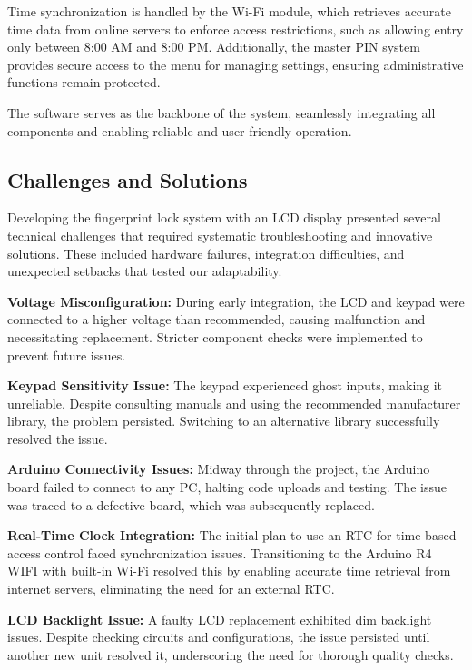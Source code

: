 \documentclass{article}
\begin{document}
Time synchronization is handled by the Wi-Fi module, which retrieves accurate time data from online servers to enforce access restrictions, such as allowing entry only between 8:00 AM and 8:00 PM. Additionally, the master PIN system provides secure access to the menu for managing settings, ensuring administrative functions remain protected.

The software serves as the backbone of the system, seamlessly integrating all components and enabling reliable and user-friendly operation.

\subsection{Challenges and Solutions}

Developing the fingerprint lock system with an LCD display presented several technical challenges that required systematic troubleshooting and innovative solutions. These included hardware failures, integration difficulties, and unexpected setbacks that tested our adaptability.

\textbf{Voltage Misconfiguration:} During early integration, the LCD and keypad were connected to a higher voltage than recommended, causing malfunction and necessitating replacement. Stricter component checks were implemented to prevent future issues.

\textbf{Keypad Sensitivity Issue:} The keypad experienced ghost inputs, making it unreliable. Despite consulting manuals and using the recommended manufacturer library, the problem persisted. Switching to an alternative library successfully resolved the issue.

\textbf{Arduino Connectivity Issues:} Midway through the project, the Arduino board failed to connect to any PC, halting code uploads and testing. The issue was traced to a defective board, which was subsequently replaced.

\textbf{Real-Time Clock Integration:} The initial plan to use an RTC for time-based access control faced synchronization issues. Transitioning to the Arduino R4 WIFI with built-in Wi-Fi resolved this by enabling accurate time retrieval from internet servers, eliminating the need for an external RTC.

\textbf{LCD Backlight Issue:} A faulty LCD replacement exhibited dim backlight issues. Despite checking circuits and configurations, the issue persisted until another new unit resolved it, underscoring the need for thorough quality checks.
\end{document}
